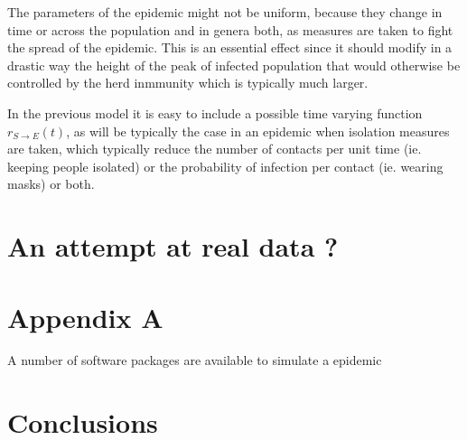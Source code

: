\documentclass[a4paper,oneside,11pt]{article}
\begin{document}
 The parameters of the epidemic might not be uniform, because they change in time or across the population and in genera both, as measures are taken to 
 fight the spread of the epidemic. This is an essential effect since it should modify in a drastic way the height of the peak of infected population that would otherwise
 be controlled by the herd inmmunity which is typically much larger. 

In the previous model it is easy to include a possible time varying function $r_{S\rightarrow E}(t)$, as will be typically the case in an epidemic when isolation measures are taken, which typically reduce the number of contacts per unit time (ie. keeping people isolated) or the probability of infection per contact (ie. wearing masks) or both. 

\section{An attempt at real data ?}

\section*{Appendix A} 

A number of software packages are available to simulate a epidemic 


  
   
 
 
 
\section{Conclusions}
\end{document}
